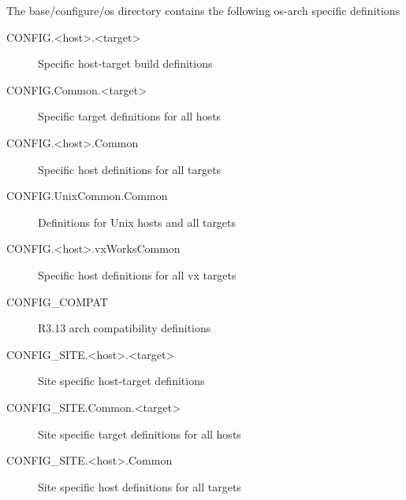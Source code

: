 The base/configure/os directory contains the following os-arch specific definitions

\begin{description}

\item[CONFIG.\textless{}host\textgreater{}.\textless{}target\textgreater{}]

Specific host-target build definitions

\item[CONFIG.Common.\textless{}target\textgreater{}]

Specific target definitions for all hosts

\item[CONFIG.\textless{}host\textgreater{}.Common]

Specific host definitions for all targets

\item[CONFIG.UnixCommon.Common]

Definitions for Unix hosts and all targets

\item[CONFIG.\textless{}host\textgreater{}.vxWorksCommon]

Specific host definitions for all vx targets

\item[CONFIG\_COMPAT]

R3.13 arch compatibility definitions

\item[CONFIG\_SITE.\textless{}host\textgreater{}.\textless{}target\textgreater{}]
Site specific host-target definitions

\item[CONFIG\_SITE.Common.\textless{}target\textgreater{}]

Site specific target definitions for all hosts

\item[CONFIG\_SITE.\textless{}host\textgreater{}.Common]

Site specific host definitions for all targets

\end{description}

